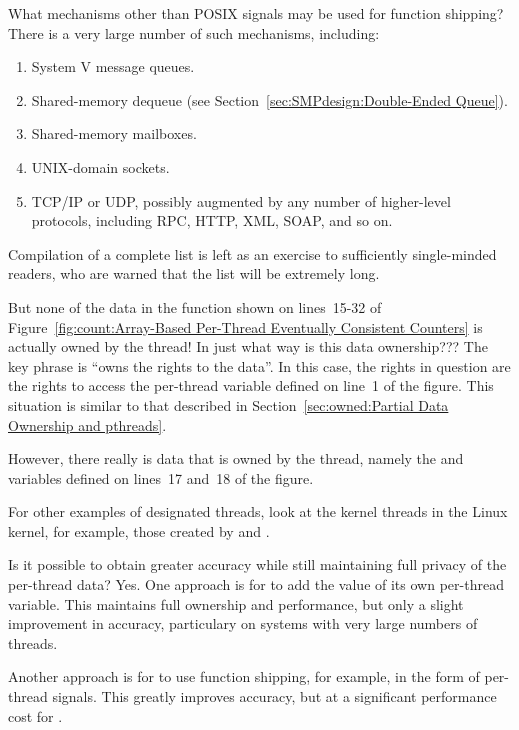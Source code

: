 \begin{enumerate}
\QuickQ{}
	What mechanisms other than POSIX signals may be used for function
	shipping?
\QuickA{}
	There is a very large number of such mechanisms, including:
	\begin{enumerate}
	\item	System V message queues.
	\item	Shared-memory dequeue (see
		Section~\ref{sec:SMPdesign:Double-Ended Queue}).
	\item	Shared-memory mailboxes.
	\item	UNIX-domain sockets.
	\item	TCP/IP or UDP, possibly augmented by any number of
		higher-level protocols, including RPC, HTTP,
		XML, SOAP, and so on.
	\end{enumerate}
	Compilation of a complete list is left as an exercise to
	sufficiently single-minded readers, who are warned that the
	list will be extremely long.

\QuickQ{}
	But none of the data in the  function shown on
	lines~15-32 of
	Figure~\ref{fig:count:Array-Based Per-Thread Eventually Consistent Counters}
	is actually owned by the  thread!
	In just what way is this data ownership???
\QuickA{}
	The key phrase is ``owns the rights to the data''.
	In this case, the rights in question are the rights to access
	the per-thread  variable defined on line~1
	of the figure.
	This situation is similar to that described in
	Section~\ref{sec:owned:Partial Data Ownership and pthreads}.

	However, there really is data that is owned by the 
	thread, namely the  and  variables defined on
	lines~17 and~18 of the figure.

	For other examples of designated threads, look at the kernel
	threads in the Linux kernel, for example, those created by
	 and .

\QuickQ{}
	Is it possible to obtain greater accuracy while still
	maintaining full privacy of the per-thread data?
\QuickA{}
	Yes.
	One approach is for  to add the value
	of its own per-thread variable.
	This maintains full ownership and performance, but only
	a slight improvement in accuracy, particulary on systems
	with very large numbers of threads.

	Another approach is for  to use function
	shipping, for example, in the form of per-thread signals.
	This greatly improves accuracy, but at a significant performance
	cost for .


\end{enumerate}
